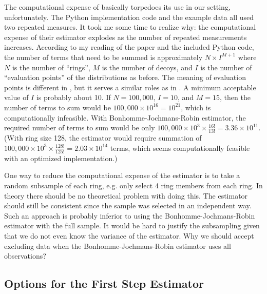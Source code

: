 \documentclass[english]{article}
\begin{document}
The computational expense of \cite{ritchie2020consistent} basically
torpedoes its use in our setting, unfortunately. The Python implementation
code and the example data all used two repeated measures. It took
me some time to realize why: the computational expense of their estimator
explodes as the number of repeated measurements increases. According
to my reading of the paper and the included Python code, the number
of terms that need to be summed is approximately $N\times I^{M+1}$
where $N$ is the number of ``rings'', $M$ is the number of decoys,
and $I$ is the number of ``evaluation points'' of the distributions
as before. The meaning of evaluation points is different in \cite{ritchie2020consistent},
but it serves a similar roles as in \cite{Bonhomme2016}. A minimum
acceptable value of $I$ is probably about 10. If $N=100,000$, $I=10$,
and $M=15$, then the number of terms to sum would be $100,000\times10^{16}=10^{21}$,
which is computationally infeasible. With Bonhomme-Jochmans-Robin
estimator, the required number of terms to sum would be only $100,000\times10^{3}\times\tfrac{16!}{13!}=3.36\times10^{11}$.
(With ring size 128, the estimator would require summation of $100,000\times10^{3}\times\tfrac{128!}{125!}=2.03\times10^{14}$
terms, which seems computationally feasible with an optimized implementation.)

One way to reduce the computational expense of the \cite{ritchie2020consistent}
estimator is to take a random subsample of each ring, e.g. only select
4 ring members from each ring. In theory there should be no theoretical
problem with doing this. The estimator should still be consistent
since the sample was selected in an independent way. Such an approach
is probably inferior to using the Bonhomme-Jochmans-Robin estimator
with the full sample. It would be hard to justify the subsampling
given that we do not even know the variance of the \cite{ritchie2020consistent}
estimator. Why we should accept excluding data when the Bonhomme-Jochmans-Robin
estimator uses all observations?

\subsection{Options for the First Step Estimator\label{subsec:Options-for-the-First-Step-Estimator}}
\end{document}
